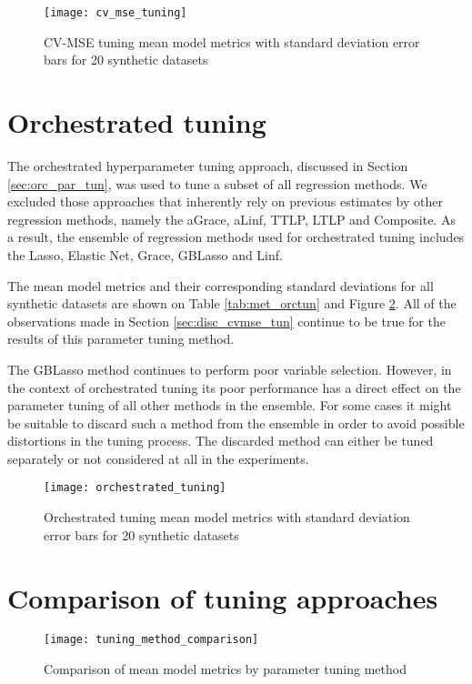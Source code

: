 
\begin{figure}[H]
	\centering
	\texttt{[image: cv\_mse\_tuning]}
	\caption{CV-MSE tuning mean model metrics with standard deviation error bars for 20 synthetic datasets}
	\label{fig:met_cvmse}
\end{figure}

\section{Orchestrated tuning}
The orchestrated hyperparameter tuning approach, discussed in Section \ref{sec:orc_par_tun}, was used to tune a subset of all regression methods. We excluded those approaches that inherently rely on previous estimates by other regression methods, namely the aGrace, aLinf, TTLP, LTLP and Composite. As a result, the ensemble of regression methods used for orchestrated tuning includes the Lasso, Elastic Net, Grace, GBLasso and Linf.

The mean model metrics and their corresponding standard deviations for all synthetic datasets are shown on Table \ref{tab:met_orctun} and Figure \ref{fig:met_orchestrated}. All of the observations made in Section \ref{sec:disc_cvmse_tun} continue to be true for the results of this parameter tuning method. 

The GBLasso method continues to perform poor variable selection. However, in the context of orchestrated tuning its poor performance has a direct effect on the parameter tuning of all other methods in the ensemble. For some cases it might be suitable to discard such a method from the ensemble in order to avoid possible distortions in the tuning process. The discarded method can either be tuned separately or not considered at all in the experiments.

\begin{figure}[H]
	\centering
	\texttt{[image: orchestrated\_tuning]}
	\caption{Orchestrated tuning mean model metrics with standard deviation error bars for 20 synthetic datasets}
	\label{fig:met_orchestrated}
\end{figure}


\section{Comparison of tuning approaches}


\begin{figure}[H]
	\centering
	\texttt{[image: tuning\_method\_comparison]}
	\caption{Comparison of mean model metrics by parameter tuning method}
	\label{fig:met_comparison}
\end{figure}

